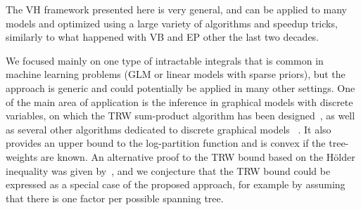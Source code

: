 \documentclass{article} %
\newcommand{\Holder}{H\"older\xspace}
\begin{document}
The VH framework presented here is very general, and can be applied to many models and
optimized using a large variety of algorithms and speedup tricks, similarly to what happened 
with VB and EP other the last two decades. 

We focused mainly on one type of intractable integrals that is common in machine learning 
problems (GLM or linear models with sparse priors), but the approach is generic and
could potentially be applied in many other settings. One of the main area of application
is the inference in graphical models with discrete variables, on which the TRW sum-product
algorithm has been designed~\citep{wainwright2005new}, as well as several other
algorithms dedicated to discrete graphical models~ \citep{liu11d}. It also provides an upper bound to the log-partition function
and is convex if the tree-weights are known. An alternative proof to the TRW bound based on the \Holder inequality
was given by~\citet{minka2005divergence}, and we conjecture that the TRW bound could be 
expressed as a special case of the proposed approach, for example by assuming that there is 
one factor per possible spanning tree.



\newpage


\end{document}
